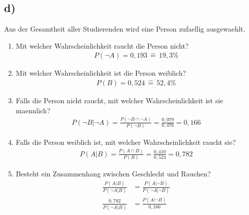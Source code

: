 \documentclass[12pt, a4paper]{article}
\begin{document}
\subsection*{d)}
Aus der Gesamtheit aller Studierenden wird eine Person zufaellig ausgewaehlt.
\begin{enumerate}
\item Mit welcher Wahrscheinlichkeit raucht die Person nicht?\\
\begin{align}
P(\neg A) = 0,193 \, \widehat{=} \, 19,3\%
\end{align}
\item Mit welcher Wahrscheinlichkeit ist die Person weiblich?
\begin{align}
P(B) = 0,524 \, \widehat{=} \, 52,4\%
\end{align}
\item Falls die Person nicht raucht, mit welcher Wahrscheinlichkeit ist sie maennlich?
\begin{align}
P(\neg B | \neg A) = \frac{P(\neg B \cap \neg A)}{P(\neg B)} = \frac{0,079}{0,476} = 0,166
\end{align}
\item Falls die Person weiblich ist, mit welcher Wahrscheinlichkeit raucht sie?
\begin{align}
P(A | B) = \frac{P(A \cap B)}{P(B)} = \frac{0,410}{0,524} = 0,782
\end{align}
\item Besteht ein Zusammenhang zwischen Geschlecht und Rauchen?
\begin{align}
\frac{P(A | B)}{P(\neg A | B)} &= \frac{P(A | \neg B)}{P(\neg A | \neg B)} \\
\frac{0,782}{P(\neg A | B)} &= \frac{P(A | \neg B)}{0,166}
\end{align}
\end{enumerate}
\vspace{0.3cm}
\end{document}

